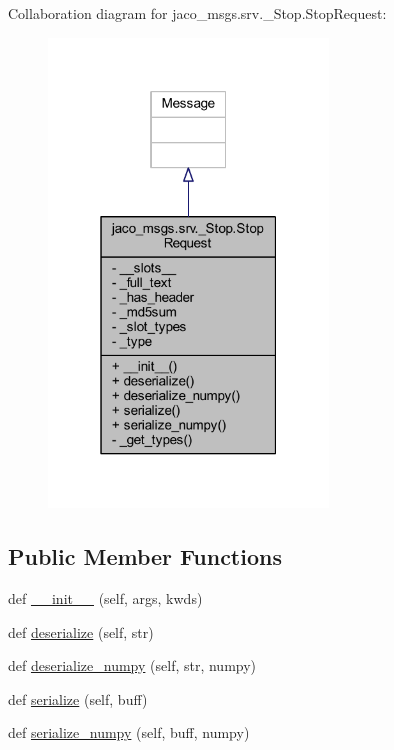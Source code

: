 Collaboration diagram for jaco\+\_\+msgs.\+srv.\+\_\+\+Stop.\+Stop\+Request\+:
\nopagebreak
\begin{figure}[H]
\begin{center}
\leavevmode
\includegraphics[width=211pt]{d2/d7c/classjaco__msgs_1_1srv_1_1__Stop_1_1StopRequest__coll__graph}
\end{center}
\end{figure}
\subsection*{Public Member Functions}
\begin{DoxyCompactItemize}
\item 
def \hyperlink{classjaco__msgs_1_1srv_1_1__Stop_1_1StopRequest_a260ee72f4930cf4c83f31ed3aa3950d1}{\+\_\+\+\_\+init\+\_\+\+\_\+} (self, args, kwds)
\item 
def \hyperlink{classjaco__msgs_1_1srv_1_1__Stop_1_1StopRequest_ad2fa2f059a69a3683667171ecb233f6f}{deserialize} (self, str)
\item 
def \hyperlink{classjaco__msgs_1_1srv_1_1__Stop_1_1StopRequest_a9e942ee7cebdb833b1948c65cfd68a70}{deserialize\+\_\+numpy} (self, str, numpy)
\item 
def \hyperlink{classjaco__msgs_1_1srv_1_1__Stop_1_1StopRequest_abdfdb6b16c912bbe1c40ea0bc8b79959}{serialize} (self, buff)
\item 
def \hyperlink{classjaco__msgs_1_1srv_1_1__Stop_1_1StopRequest_ae7bb71049167bfc5820de52c083724d9}{serialize\+\_\+numpy} (self, buff, numpy)
\end{DoxyCompactItemize}
